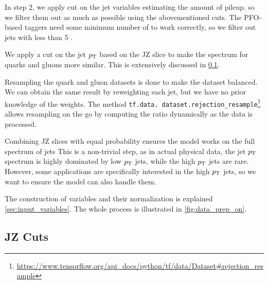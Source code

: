 In step 2, we apply cut on the jet variables estimating the amount of pileup.
 so we filter them out as much as possible using the abovementioned cuts.
The PFO-based taggers need some minimum number of \PFOs to work correctly, so we filter out jets with less than 5 \PFOs.

We apply a cut on the jet $p_\text{T}$ based on the JZ slice to make the spectrum for quarks and gluons more similar.
This is extensively discussed in \cref{sec:jet_pt_cuts}.

Resampling the quark and gluon datasets is done to make the dataset balanced.
We can obtain the same result by reweighting each jet, but we have no prior knowledge of the weights.
The method \texttt{tf.data. dataset.rejection\_resample}\footnote{\url{https://www.tensorflow.org/api_docs/python/tf/data/Dataset\#rejection\_resample}} allows resampling on the go by computing the ratio dynamically as the data is processed.

Combining JZ slices with equal probability ensures the model works on the full spectrum of jets 
This is a non-trivial step, as in actual physical data, the jet $p_\text{T}$ spectrum is highly dominated by low $p_\text{T}$ jets, while the high $p_\text{T}$ jets are rare. 
However, some applications are specifically interested in the high $p_\text{T}$ jets, so we want to ensure the model can also handle them.

The construction of variables and their normalization is explained \cref{sec:input_variables}.
The whole process is illustrated in \cref{fig:data_prep_on}.


\subsection{JZ Cuts}
\label{sec:jet_pt_cuts}

